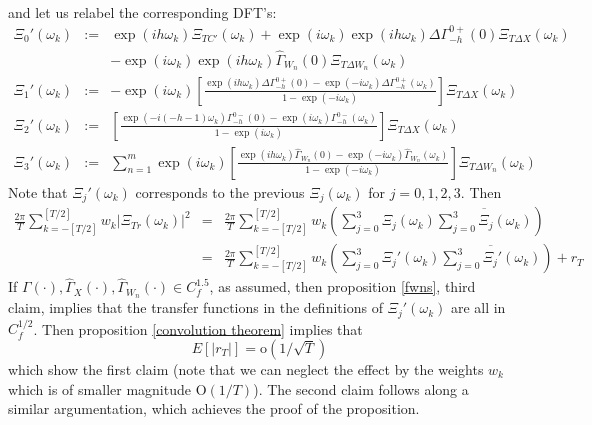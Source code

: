 \documentclass[11pt]{article}
\begin{document}
\begin{appendix}
\begin{eqnarray}
\end{eqnarray} 
and let us relabel the corresponding DFT's:
\begin{eqnarray*}
\Xi_0'(\omega_k)&:=& \exp(ih\omega_k)\Xi_{TC'}(\omega_k)+\exp(i\omega_k)\exp(ih\omega_k)\Delta\Gamma_{-h}^{0+}(0)\Xi_{T\Delta X}(\omega_k)\\
&&-\exp(i\omega_k)\exp(ih\omega_k)\hat{\Gamma}_{W_n}(0)\Xi_{T\Delta W_n}(\omega_k)\\
\Xi_{1}'(\omega_k)&:=&-\exp(i\omega_k)\left[\frac{\exp(ih\omega_k)\Delta\Gamma_{-h}^{0+}(0)-\exp(-i\omega_k)\Delta\Gamma_{-h}^{0+}(\omega_k)}{1-\exp(-i\omega_k)}\right]\Xi_{T\Delta X}(\omega_k)\\
\Xi_{2}'(\omega_k)&:=&\left[\frac{\exp(-i(-h-1)\omega_k)\Gamma_{-h}^{0-}(0)-\exp(i\omega_k)\Gamma_{-h}^{0-}(\omega_k)}{1-\exp(i\omega_k)}\right]\Xi_{T\Delta X}(\omega_k)\\
\Xi_3'(\omega_k)&:=&\sum_{n=1}^m\exp(i\omega_k)\left[\frac{\exp(ih\omega_k)\hat{\Gamma}_{W_n}(0)-\exp(-i\omega_k)\hat{\Gamma}_{W_n}(\omega_k)}{1-\exp(-i\omega_k)}\right]\Xi_{T\Delta W_n}(\omega_k)
\end{eqnarray*}
Note that $\Xi_j'(\omega_k)$  corresponds to the previous $\Xi_j(\omega_k)$ for $j=0,1,2,3$. Then
\begin{eqnarray*}
\frac{2\pi}{T}\sum_{k=-[T/2]}^{[T/2]}w_k\left|\Xi_{Tr}(\omega_k)\right|^2&=&\frac{2\pi}{T}\sum_{k=-[T/2]}^{[T/2]}w_k\left(\sum_{j=0}^3 \Xi_j(\omega_k)\overline{\sum_{j=0}^3 \Xi_j(\omega_k)}\right)\\
&=&\frac{2\pi}{T}\sum_{k=-[T/2]}^{[T/2]}w_k\left(\sum_{j=0}^3 \Xi_j'(\omega_k)\overline{\sum_{j=0}^3 \Xi_j'(\omega_k)}\right)+r_T
\end{eqnarray*}
If $\Gamma(\cdot),\hat{\Gamma}_X(\cdot),\hat{\Gamma}_{W_n}(\cdot)\in C_f^{1.5}$, as assumed, then proposition \ref{fwns}, third claim, implies that the transfer functions in the definitions of $\Xi_{j}'(\omega_k)$ are all in $C_f^{1/2}$. Then proposition \ref{convolution theorem} implies that 
\[E[|r_T|]=\textrm{o}(1/\sqrt{T})\]
which show the first claim (note that we can neglect the effect by the weights $w_k$ which is of smaller magnitude $\textrm{O}(1/T)$). The second claim follows along a similar  argumentation, which achieves the proof of the proposition.\\




\end{appendix}
\end{document}
